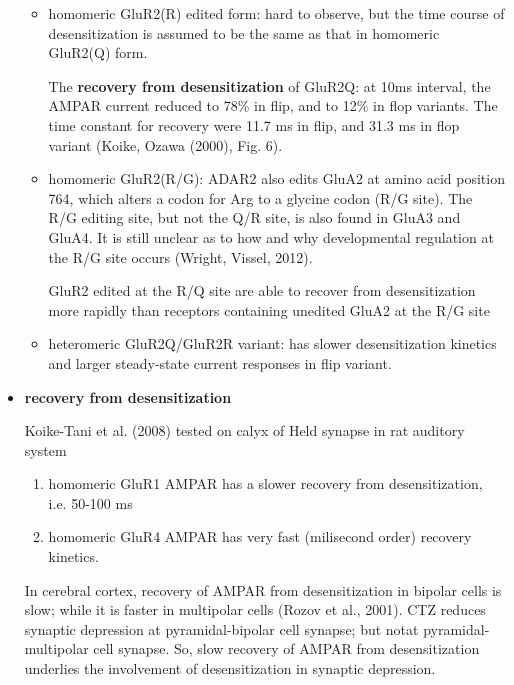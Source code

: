 \begin{itemize}
\begin{itemize}
    \item homomeric GluR2(R) edited form: hard to observe, but the time course
    of desensitization is assumed to be the same as that in homomeric GluR2(Q)
    form.
    
    The {\bf recovery from desensitization} of GluR2Q: at 10ms interval, the
    AMPAR current reduced to 78\% in flip, and to 12\% in flop variants. The time
    constant for recovery were 11.7 ms in flip, and 31.3 ms in flop variant
    (Koike, Ozawa (2000), Fig. 6).
    
    
    \item homomeric GluR2(R/G):
    ADAR2 also edits GluA2 at amino acid position 764, which alters a codon for
    Arg to a glycine codon (R/G site). The R/G editing site, but not the Q/R
    site, is also found in GluA3 and GluA4.
    It is still unclear as to how and why developmental regulation at the R/G
    site occurs (Wright, Vissel, 2012). 
    
    GluR2 edited at the R/Q site are able to recover from desensitization more
    rapidly than receptors containing unedited GluA2 at the R/G site
    
    \item heteromeric GluR2Q/GluR2R variant: has slower desensitization kinetics
    and larger steady-state current responses in flip variant. 
    
  \end{itemize} 
  
   \item {\bf recovery from desensitization}

  Koike-Tani et al. (2008) tested on calyx of Held synapse in rat auditory
  system
  \begin{enumerate}
    \item  homomeric GluR1 AMPAR has a slower recovery from desensitization,
    i.e.  50-100 ms
    
    \item homomeric GluR4 AMPAR has very fast (milisecond order) recovery
    kinetics.
  \end{enumerate}
     
    In cerebral cortex, recovery of AMPAR from desensitization in bipolar cells
    is slow; while it is faster in multipolar cells (Rozov et al., 2001).
    CTZ reduces synaptic depression at pyramidal-bipolar cell synapse; but notat
    pyramidal-multipolar cell synapse. So, slow recovery of AMPAR from
    desensitization underlies the involvement of desensitization in synaptic
    depression.
    
\end{itemize}


